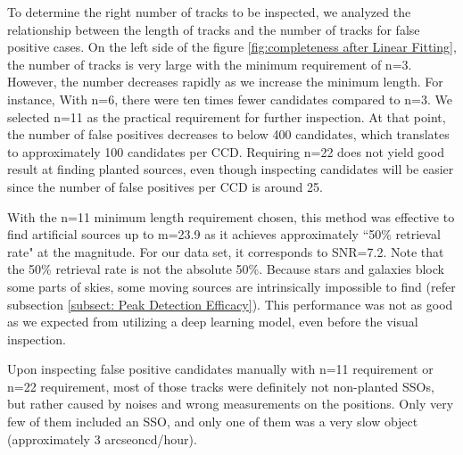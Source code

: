 \documentclass{aastex631}
\begin{document}
To determine the right number of tracks to be inspected, we analyzed the relationship between the length of tracks and the number of tracks for false positive cases.
On the left side of the figure \ref{fig:completeness after Linear Fitting}, the number of tracks is very large with the minimum requirement of n=3.
However, the number decreases rapidly as we increase the minimum length.
For instance, With n=6, there were ten times fewer candidates compared to n=3.
We selected n=11 as the practical requirement for further inspection.
At that point, the number of false positives decreases to below 400 candidates, which translates to approximately 100 candidates per CCD.
Requiring n=22 does not yield good result at finding planted sources, even though inspecting candidates will be easier since the number of false positives per CCD is around 25.


With the n=11 minimum length requirement chosen, this method was effective to find artificial sources up to m=23.9 as it achieves approximately ``50\% retrieval rate" at the magnitude.
For our data set, it corresponds to SNR=7.2.
Note that the 50\% retrieval rate is not the absolute 50\%.
Because stars and galaxies block some parts of skies, some moving sources are intrinsically impossible to find (refer subsection \ref{subsect: Peak Detection Efficacy}).
This performance was not as good as we expected from utilizing a deep learning model, even before the visual inspection.

Upon inspecting false positive candidates manually with n=11 requirement or n=22 requirement, most of those tracks were definitely not non-planted SSOs, but rather caused by noises and wrong measurements on the positions.
Only very few of them included an SSO, and only one of them was a very slow object (approximately 3 arcseoncd/hour).
\end{document}
